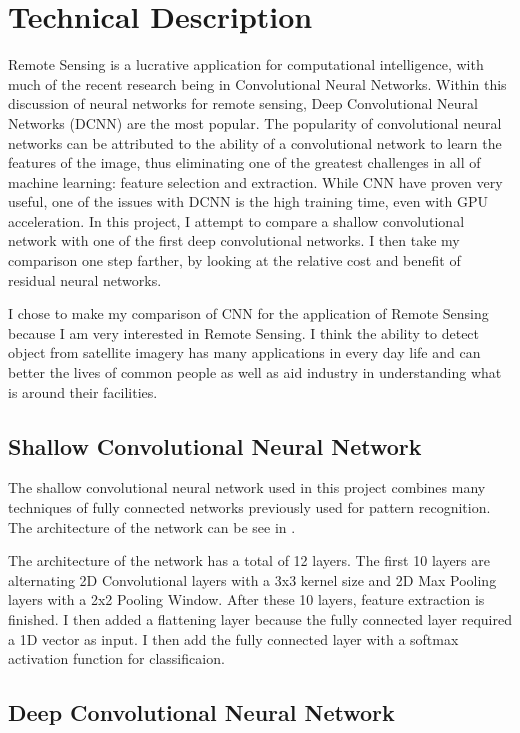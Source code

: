 \documentclass[12pt]{article}
\begin{document}
	\section{Technical Description}
	
Remote Sensing is a lucrative application for computational intelligence, with much of the recent research being in Convolutional Neural Networks. Within this discussion of neural networks for remote sensing, Deep Convolutional Neural Networks (DCNN) are the most popular. The popularity of convolutional neural networks can be attributed to the ability of a convolutional network to learn the features of the image, thus eliminating one of the greatest challenges in all of machine learning: feature selection and extraction. While CNN have proven very useful, one of the issues with DCNN is the high training time, even with GPU acceleration. In this project, I attempt to compare a shallow convolutional network with one of the first deep convolutional networks. I then take my comparison one step farther, by looking at the relative cost and benefit of residual neural networks. 
		
I chose to make my comparison of CNN for the application of Remote Sensing because I am very interested in Remote Sensing. I think the ability to detect object from satellite imagery has many applications in every day life and can better the lives of common people as well as aid industry in understanding what is around their facilities. 
		
		\subsection{Shallow Convolutional Neural Network}
		
The shallow convolutional neural network used in this project combines many techniques of fully connected networks previously used for pattern recognition. The architecture of the network can be see in .
		
The architecture of the network has a total of 12 layers. The first 10 layers are alternating 2D Convolutional layers with a 3x3 kernel size and 2D Max Pooling layers with a 2x2 Pooling Window. After these 10 layers, feature extraction is finished. I then added a flattening layer because the fully connected layer required a 1D vector as input. I then add the fully connected layer with a softmax activation function for classificaion.
		
		
		\subsection{Deep Convolutional Neural Network}
		
\end{document}
